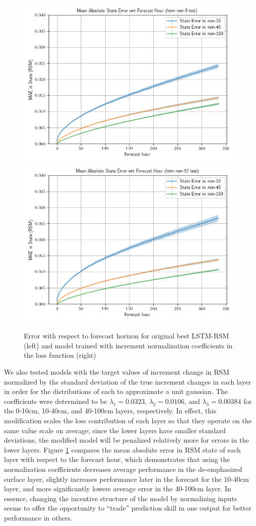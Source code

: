 \begin{figure}[h!]
    \centering
    \includegraphics[width=.48\linewidth,draft=false]{figures/loss-variations/eval_test_lstm-rsm-9_rsm_horizon_na_state.png}
    \includegraphics[width=.48\linewidth,draft=false]{figures/loss-variations/eval_test_lstm-rsm-57_rsm_horizon_na_state.png}

    \caption{Error with respect to forecast horizon for original best LSTM-RSM (left) and model trained with increment normalization coefficients in the loss function (right)}
    \label{loss-fn-norm-horizons}
\end{figure}

We also tested models with the target values of increment change in RSM normalized by the standard deviation of the true increment changes in each layer in order for the distributions of each to approximate a unit gaussian. The coefficients were determined to be $\lambda_1=0.0323$, $\lambda_2=0.0106$, and $\lambda_3=0.00384$ for the 0-10cm, 10-40cm, and 40-100cm layers, respectively. In effect, this modification scales the loss contribution of each layer so that they operate on the same value scale on average; since the lower layers have smaller standard deviations, the modified model will be penalized relatively more for errors in the lower layers. Figure \ref{loss-fn-norm-horizons} compares the mean absolute error in RSM state of each layer with respect to the forecast hour, which demonstrates that using the normalization coefficients decreases average performance in the de-emphasized surface layer, slightly increases performance later in the forecast for the 10-40cm layer, and more significantly lowers average error in the 40-100cm layer. In essence, changing the incentive structure of the model by normalizing inputs seems to offer the opportunity to ``trade'' prediction skill in one output for better performance in others.


